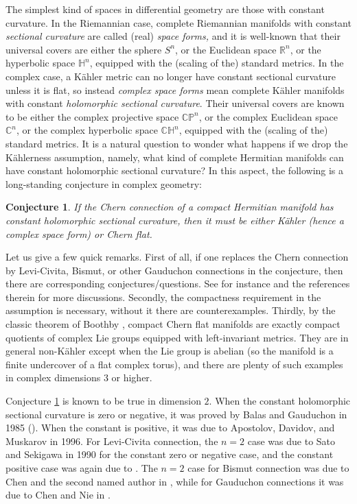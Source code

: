 \documentclass{amsart}
\newtheorem{conjecture}{Conjecture}
\begin{document}
The simplest kind of spaces in differential geometry are those with constant curvature. In the Riemannian case, complete Riemannian manifolds with constant {\em sectional curvature} are called (real) {\em space forms,} and it is well-known that their universal covers are either the sphere $S^n$, or the Euclidean space ${\mathbb R}^n$, or the hyperbolic space ${\mathbb H}^n$, equipped with the (scaling of the) standard metrics. In the complex case, a K\"ahler metric can no longer have constant sectional curvature unless it is flat, so instead {\em complex space forms} mean complete K\"ahler manifolds with constant {\em holomorphic sectional curvature}. Their universal covers are known to be either the complex projective space  ${\mathbb C}{\mathbb P}^n$, or the complex Euclidean space ${\mathbb C}^n$, or the complex hyperbolic space ${\mathbb C}{\mathbb H}^n$, equipped with the (scaling of the) standard metrics. It is a natural question to wonder what happens if we drop the K\"ahlerness assumption, namely, what kind of complete Hermitian manifolds can have constant holomorphic sectional curvature? In this aspect, the following is a long-standing conjecture in complex geometry:

\begin{conjecture} \label{conj1}
If the Chern connection of a compact Hermitian manifold has constant holomorphic sectional curvature, then it must be either K\"ahler (hence a complex space form) or Chern flat.
\end{conjecture}

Let us give a few quick remarks. First of all, if one replaces the Chern connection by Levi-Civita, Bismut, or other Gauduchon connections in the conjecture, then there are corresponding conjectures/questions. See for instance \cite{CN, ChenZ, ChenZ1} and the references therein for more discussions. Secondly, the compactness requirement in the assumption is necessary, without it there are counterexamples. Thirdly, by the classic theorem of Boothby \cite{Boothby}, compact Chern flat manifolds are exactly compact quotients of complex Lie groups equipped with left-invariant metrics. They are in general non-K\"ahler except when the Lie group is abelian (so the manifold is a finite undercover of a flat complex torus), and there are plenty of such examples in complex dimensions $3$ or higher.  

Conjecture \ref{conj1} is known to be true in dimension $2$. When the constant holomorphic sectional curvature is zero or negative, it was proved by Balas and Gauduchon  in 1985 (\cite{Balas, BG}). When the constant is positive, it was due to Apostolov, Davidov, and Muskarov \cite{ADM} in 1996. For Levi-Civita connection, the $n=2$ case was due to Sato and Sekigawa \cite{SatoSeki} in 1990 for the constant zero or negative case, and the constant positive case was again due to \cite{ADM}. The $n=2$ case for Bismut connection was due to Chen and the second named author in \cite{ChenZ}, while for Gauduchon connections it was due to Chen and Nie in \cite{CN}.  
\end{document}

